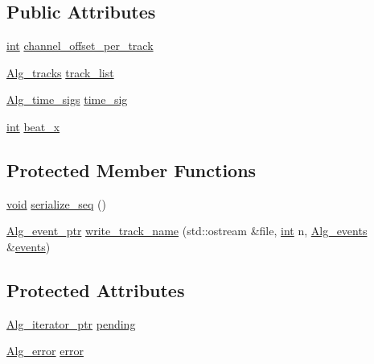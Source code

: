\subsection*{Public Attributes}
\begin{DoxyCompactItemize}
\item 
\hyperlink{xmltok_8h_a5a0d4a5641ce434f1d23533f2b2e6653}{int} \hyperlink{class_alg__seq_a400b8ba6d4d91ee76dfcaf3fa96a6ca9}{channel\+\_\+offset\+\_\+per\+\_\+track}
\item 
\hyperlink{class_alg__tracks}{Alg\+\_\+tracks} \hyperlink{class_alg__seq_a5e3339e77f1ef07f5af0fbfc0ba97bc9}{track\+\_\+list}
\item 
\hyperlink{class_alg__time__sigs}{Alg\+\_\+time\+\_\+sigs} \hyperlink{class_alg__seq_a6edff43d6932fc8b2cf53553fd97f565}{time\+\_\+sig}
\item 
\hyperlink{xmltok_8h_a5a0d4a5641ce434f1d23533f2b2e6653}{int} \hyperlink{class_alg__seq_a51f20bf225e80a1e646a0759aa933fc9}{beat\+\_\+x}
\end{DoxyCompactItemize}
\subsection*{Protected Member Functions}
\begin{DoxyCompactItemize}
\item 
\hyperlink{sound_8c_ae35f5844602719cf66324f4de2a658b3}{void} \hyperlink{class_alg__seq_a5aec18e07d6146c93a6a26db54c2842d}{serialize\+\_\+seq} ()
\item 
\hyperlink{allegro_8h_aeb8db009b4ffadef2e7ca0e4936f0307}{Alg\+\_\+event\+\_\+ptr} \hyperlink{class_alg__seq_ab6b0fd65140ad80943f999b43a86b524}{write\+\_\+track\+\_\+name} (std\+::ostream \&file, \hyperlink{xmltok_8h_a5a0d4a5641ce434f1d23533f2b2e6653}{int} n, \hyperlink{class_alg__events}{Alg\+\_\+events} \&\hyperlink{class_alg__events_a223e3022acbbb386c1cbc6346054c5d3}{events})
\end{DoxyCompactItemize}
\subsection*{Protected Attributes}
\begin{DoxyCompactItemize}
\item 
\hyperlink{allegro_8h_ae139466fdcd075a57d0c0c79e881f7e8}{Alg\+\_\+iterator\+\_\+ptr} \hyperlink{class_alg__seq_a3132340d161c2e720e74cc5048664d3c}{pending}
\item 
\hyperlink{allegro_8h_aee8f40d8180d087b017308cf0729a458}{Alg\+\_\+error} \hyperlink{class_alg__seq_a4f93e99fab0622901ce5281203c3dea8}{error}
\end{DoxyCompactItemize}
